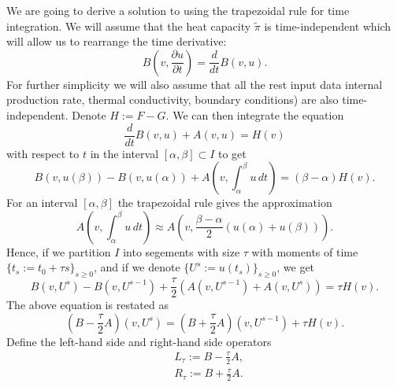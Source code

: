 \begin{discussion}
  \label{cmc/diffusion/discrete/transient/primal_weak_solve_trapezoidal-discussion}
  We are going to derive a solution to
  using the trapezoidal rule for time integration.
  We will assume that the heat capacity $\tilde{\pi}$ is time-independent which will
  allow us to rearrange the time derivative:
  \begin{equation}
    B(v, \frac{\partial u} {\partial t}) = \frac{d}{d t} B(v, u).
  \end{equation}
  For further simplicity we will also assume that all the rest input data
  internal production rate, thermal conductivity, boundary conditions)
  are also time-independent.
  Denote $H := F - G$.
  We can then integrate the equation
  \begin{equation}
    \frac{d}{d t} B(v, u) + A(v, u) = H(v)
  \end{equation}
  with respect to $t$ in the interval $[\alpha, \beta] \subset I$ to get
  \begin{equation}
    B(v, u(\beta)) - B(v, u(\alpha))
    + A(v, \int_\alpha^\beta u\, d t)
    = (\beta - \alpha) H(v).
  \end{equation}
  For an interval $[\alpha, \beta]$ the trapezoidal rule gives the approximation
  \begin{equation}
    A(v, \int_\alpha^\beta u\, d t)
    \approx A(v, \frac{\beta - \alpha}{2} (u(\alpha) + u(\beta))).
  \end{equation}
  Hence, if we partition $I$ into segements with size $\tau$ with moments of
  time $\{t_s := t_0 + \tau s\}_{s \geq 0}$, and if we denote
  $\{U^s := u(t_s)\}_{s \geq 0}$, we get
  \begin{equation}
    B(v, U^s) - B(v, U^{s - 1})
    + \frac{\tau}{2} (A(v, U^{s - 1}) + A(v, U^s))
    = \tau H(v).
  \end{equation}
  The above equation is restated as
  \begin{equation}
    (B - \frac{\tau}{2} A)(v, U^s)
    = (B + \frac{\tau}{2} A)(v, U^{s - 1}) + \tau H(v).
  \end{equation}
  Define the left-hand side and right-hand side operators
  \begin{subequations}
    \begin{alignat}{1}
      & L_\tau := B - \frac{\tau}{2} A, \\
      & R_\tau := B + \frac{\tau}{2} A.
    \end{alignat}

\end{subequations}
\end{discussion}
